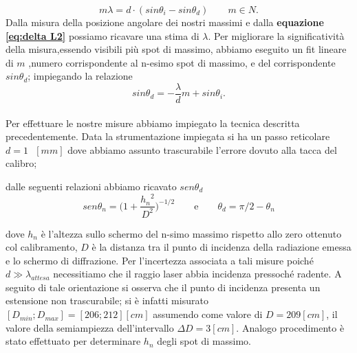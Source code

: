 \begin{equation}\label{eq:delta L2}
m \lambda = d \cdot (sin \theta_i - sin \theta_d) \qquad m\in N.
\end{equation}
\smallskip
Dalla misura della posizione angolare dei nostri
massimi e dalla \textbf{equazione \ref{eq:delta L2}}
possiamo ricavare una stima di $\lambda$.
Per migliorare la significatività della 
misura,essendo visibili più
spot di massimo,
abbiamo eseguito un fit lineare
di $m$ ,numero corrispondente al n-esimo
spot di massimo, e del corrispondente
$ sin \theta_d$;
impiegando la relazione 
\smallskip
$$ sin \theta_d =-\frac{\lambda}{d}m+sin \theta_i.$$
\smallskip
\\
Per effettuare le nostre misure abbiamo
impiegato la tecnica descritta precedentemente.
Data la strumentazione impiegata 
si ha un passo reticolare $d=1\text{ }[mm]$ 
dove abbiamo assunto trascurabile l'errore dovuto alla
tacca del calibro;%



dalle seguenti relazioni abbiamo ricavato $sen \theta_d$ 
\smallskip 
\begin{equation} \label{sen rif}
sen \theta_n = {(1+\frac{{h_n}^2}{{D}^2}})^{-1/2}\qquad \text{e}\qquad \theta_d= \pi/2 - \theta_n
\end{equation}

\smallskip
dove $h_n$ è l'altezza sullo schermo del n-simo 
massimo rispetto allo zero ottenuto
col calibramento,
$D$ è la distanza tra il punto di incidenza 
della radiazione emessa e lo schermo di diffrazione.
Per l'incertezza associata a tali misure
poiché $d\gg \lambda_{attesa}$ necessitiamo che il raggio laser abbia
incidenza  pressoché radente.
A seguito di tale orientazione si osserva che il
punto di incidenza 
presenta un estensione non trascurabile;
si è infatti misurato $[D_{min};D_{max}]= [206;212] [cm]$ 
assumendo come valore di $D= 209 [cm]$, il valore della 
semiampiezza dell'intervallo  $\Delta D = 3 [cm]$.
Analogo procedimento è stato effettuato per determinare $h_n$ degli spot
di massimo.

